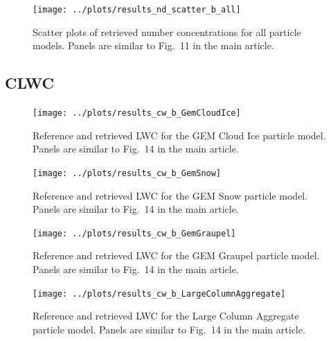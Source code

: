 \documentclass[journal abbreviation, manuscript]{copernicus}
\begin{document}
\clearpage
\begin{figure}[!hbpt]
\centering
\texttt{[image: ../plots/results\_nd\_scatter\_b\_all]}
\caption{Scatter plots of retrieved number concentrations for all particle models. Panels
are similar to Fig.~11 in the main article.}
\end{figure}

\subsection{CLWC}

\clearpage
\begin{figure}[!hbpt]
\centering
\texttt{[image: ../plots/results\_cw\_b\_GemCloudIce]}
\caption{Reference and retrieved LWC for the GEM Cloud Ice particle model. Panels are similar to
Fig.~14 in the main article.}
\end{figure}

\clearpage
\begin{figure}[!hbpt]
\centering
\texttt{[image: ../plots/results\_cw\_b\_GemSnow]}
\caption{Reference and retrieved LWC for the GEM Snow particle model. Panels are similar to
Fig.~14 in the main article.}
\end{figure}

\clearpage
\begin{figure}[!hbpt]
\centering
\texttt{[image: ../plots/results\_cw\_b\_GemGraupel]}
\caption{Reference and retrieved LWC for the GEM Graupel particle model. Panels are similar to
Fig.~14 in the main article.}
\end{figure}

\clearpage
\begin{figure}[!hbpt]
\centering
\texttt{[image: ../plots/results\_cw\_b\_LargeColumnAggregate]}
\caption{Reference and retrieved LWC for the Large Column Aggregate particle model. Panels are similar to
Fig.~14 in the main article.}
\end{figure}

\noappendix       %
\end{document}
